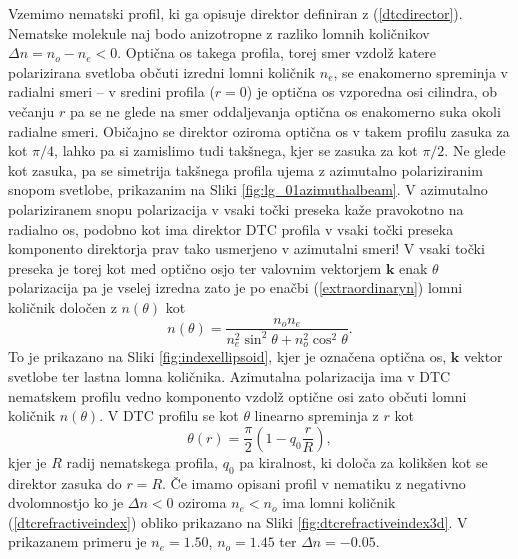 \documentclass[longbibliography,slovene,a4paper,12pt]{book}
\begin{document}
Vzemimo nematski profil, ki ga opisuje direktor definiran z (\ref{dtcdirector}). Nematske molekule naj bodo anizotropne z razliko lomnih količnikov $\Delta n = n_o - n_e < 0$. Optična os takega profila, torej smer vzdolž katere polarizirana svetloba občuti izredni lomni količnik $n_e$, se enakomerno spreminja v radialni smeri -- v sredini profila ($r=0$) je optična os vzporedna osi cilindra, ob večanju $r$ pa se ne glede na smer oddaljevanja optična os enakomerno suka okoli radialne smeri. Običajno se direktor oziroma optična os v takem profilu zasuka za kot $\pi/4$, lahko pa si zamislimo tudi takšnega, kjer se zasuka za kot $\pi/2$. Ne glede kot zasuka, pa se simetrija takšnega profila ujema z azimutalno polariziranim snopom svetlobe, prikazanim na Sliki \ref{fig:lg_01azimuthalbeam}. V azimutalno polariziranem snopu polarizacija v vsaki točki preseka kaže pravokotno na radialno os, podobno kot ima direktor DTC profila v vsaki točki preseka komponento direktorja prav tako usmerjeno v azimutalni smeri! V vsaki točki preseka je torej kot med optično osjo ter valovnim vektorjem $\mathbf{k}$ enak $\theta$ polarizacija pa je vselej izredna zato je po enačbi (\ref{extraordinaryn}) lomni količnik določen z $n(\theta)$ kot
\begin{equation}
n(\theta) = \frac{n_o n_e}{n_e^2 \sin^2 \theta + n_o^2 \cos^2 \theta}.
\label{dtcrefractiveindex}
\end{equation}
To je prikazano na Sliki \ref{fig:indexellipsoid}, kjer je označena optična os, $\mathbf{k}$ vektor svetlobe ter lastna lomna količnika. Azimutalna polarizacija ima v DTC nematskem profilu vedno komponento vzdolž optične osi zato občuti lomni količnik $n(\theta)$. V DTC profilu se kot $\theta$ linearno spreminja z $r$ kot
\begin{equation}
\theta(r) = \frac{\pi}{2} (1-q_0\frac{r}{R}),
\end{equation}
kjer je $R$ radij nematskega profila, $q_0$ pa kiralnost, ki določa za kolikšen kot se direktor zasuka do $r = R$. Če imamo opisani profil v nematiku z negativno dvolomnostjo ko je $\Delta n < 0$ oziroma $n_e < n_o$ ima lomni količnik (\ref{dtcrefractiveindex}) obliko prikazano na Sliki \ref{fig:dtcrefractiveindex3d}. V prikazanem primeru je $n_e = 1.50$, $n_o = 1.45$ ter $\Delta n = -0.05$.
\end{document}
